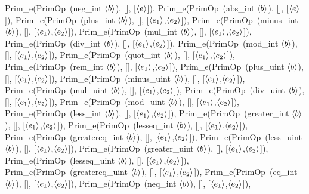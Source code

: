 \documentclass[12pt,twoside,fleqn]{article}
\begin{document}
   {Prim\_e(PrimOp~(neg\_int $\langle{b}\rangle$), [], 
       [$\langle{e}\rangle$]),
    Prim\_e(PrimOp~(abs\_int $\langle{b}\rangle$), [], 
       [$\langle{e}\rangle$]),
    Prim\_e(PrimOp~(plus\_int $\langle{b}\rangle$), [], 
       [$\langle{e_1}\rangle$,$\langle{e_2}\rangle$]),
    Prim\_e(PrimOp~(minus\_int $\langle{b}\rangle$), [], 
       [$\langle{e_1}\rangle$,$\langle{e_2}\rangle$]),
    Prim\_e(PrimOp~(mul\_int $\langle{b}\rangle$), [], 
       [$\langle{e_1}\rangle$,$\langle{e_2}\rangle$]),
    Prim\_e(PrimOp~(div\_int $\langle{b}\rangle$), [], 
       [$\langle{e_1}\rangle$,$\langle{e_2}\rangle$]),
    Prim\_e(PrimOp~(mod\_int $\langle{b}\rangle$), [], 
       [$\langle{e_1}\rangle$,$\langle{e_2}\rangle$]),
    Prim\_e(PrimOp~(quot\_int $\langle{b}\rangle$), [], 
       [$\langle{e_1}\rangle$,$\langle{e_2}\rangle$]),
    Prim\_e(PrimOp~(rem\_int $\langle{b}\rangle$), [], 
       [$\langle{e_1}\rangle$,$\langle{e_2}\rangle$]),
    Prim\_e(PrimOp~(plus\_uint $\langle{b}\rangle$), [], 
       [$\langle{e_1}\rangle$,$\langle{e_2}\rangle$]),
    Prim\_e(PrimOp~(minus\_uint $\langle{b}\rangle$), [], 
       [$\langle{e_1}\rangle$,$\langle{e_2}\rangle$]),
    Prim\_e(PrimOp~(mul\_uint $\langle{b}\rangle$), [], 
       [$\langle{e_1}\rangle$,$\langle{e_2}\rangle$]),
    Prim\_e(PrimOp~(div\_uint $\langle{b}\rangle$), [], 
       [$\langle{e_1}\rangle$,$\langle{e_2}\rangle$]),
    Prim\_e(PrimOp~(mod\_uint $\langle{b}\rangle$), [], 
       [$\langle{e_1}\rangle$,$\langle{e_2}\rangle$]),
    Prim\_e(PrimOp~(less\_int $\langle{b}\rangle$), [], 
       [$\langle{e_1}\rangle$,$\langle{e_2}\rangle$]),
    Prim\_e(PrimOp~(greater\_int $\langle{b}\rangle$), [], 
       [$\langle{e_1}\rangle$,$\langle{e_2}\rangle$]),
    Prim\_e(PrimOp~(lesseq\_int $\langle{b}\rangle$), [], 
       [$\langle{e_1}\rangle$,$\langle{e_2}\rangle$]),
    Prim\_e(PrimOp~(greatereq\_int $\langle{b}\rangle$), [], 
       [$\langle{e_1}\rangle$,$\langle{e_2}\rangle$]),
    Prim\_e(PrimOp~(less\_uint $\langle{b}\rangle$), [], 
       [$\langle{e_1}\rangle$,$\langle{e_2}\rangle$]),
    Prim\_e(PrimOp~(greater\_uint $\langle{b}\rangle$), [], 
       [$\langle{e_1}\rangle$,$\langle{e_2}\rangle$]),
    Prim\_e(PrimOp~(lesseq\_uint $\langle{b}\rangle$), [], 
       [$\langle{e_1}\rangle$,$\langle{e_2}\rangle$]),
    Prim\_e(PrimOp~(greatereq\_uint $\langle{b}\rangle$), [], 
       [$\langle{e_1}\rangle$,$\langle{e_2}\rangle$]),
    Prim\_e(PrimOp~(eq\_int $\langle{b}\rangle$), [], 
       [$\langle{e_1}\rangle$,$\langle{e_2}\rangle$]),
    Prim\_e(PrimOp~(neq\_int $\langle{b}\rangle$), [], 
       [$\langle{e_1}\rangle$,$\langle{e_2}\rangle$]),
   }
\end{document}
